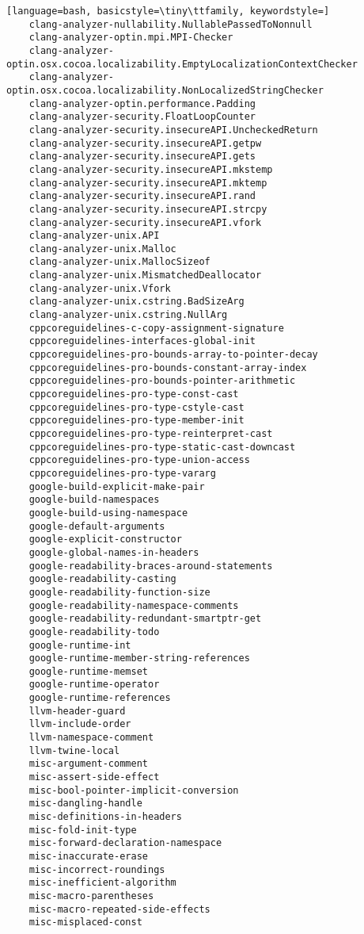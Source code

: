 \documentclass[aspectratio=169]{beamer}
\begin{document}
\begin{lstlisting}[language=bash, basicstyle=\tiny\ttfamily, keywordstyle=]
    clang-analyzer-nullability.NullablePassedToNonnull
    clang-analyzer-optin.mpi.MPI-Checker
    clang-analyzer-optin.osx.cocoa.localizability.EmptyLocalizationContextChecker
    clang-analyzer-optin.osx.cocoa.localizability.NonLocalizedStringChecker
    clang-analyzer-optin.performance.Padding
    clang-analyzer-security.FloatLoopCounter
    clang-analyzer-security.insecureAPI.UncheckedReturn
    clang-analyzer-security.insecureAPI.getpw
    clang-analyzer-security.insecureAPI.gets
    clang-analyzer-security.insecureAPI.mkstemp
    clang-analyzer-security.insecureAPI.mktemp
    clang-analyzer-security.insecureAPI.rand
    clang-analyzer-security.insecureAPI.strcpy
    clang-analyzer-security.insecureAPI.vfork
    clang-analyzer-unix.API
    clang-analyzer-unix.Malloc
    clang-analyzer-unix.MallocSizeof
    clang-analyzer-unix.MismatchedDeallocator
    clang-analyzer-unix.Vfork
    clang-analyzer-unix.cstring.BadSizeArg
    clang-analyzer-unix.cstring.NullArg
    cppcoreguidelines-c-copy-assignment-signature
    cppcoreguidelines-interfaces-global-init
    cppcoreguidelines-pro-bounds-array-to-pointer-decay
    cppcoreguidelines-pro-bounds-constant-array-index
    cppcoreguidelines-pro-bounds-pointer-arithmetic
    cppcoreguidelines-pro-type-const-cast
    cppcoreguidelines-pro-type-cstyle-cast
    cppcoreguidelines-pro-type-member-init
    cppcoreguidelines-pro-type-reinterpret-cast
    cppcoreguidelines-pro-type-static-cast-downcast
    cppcoreguidelines-pro-type-union-access
    cppcoreguidelines-pro-type-vararg
    google-build-explicit-make-pair
    google-build-namespaces
    google-build-using-namespace
    google-default-arguments
    google-explicit-constructor
    google-global-names-in-headers
    google-readability-braces-around-statements
    google-readability-casting
    google-readability-function-size
    google-readability-namespace-comments
    google-readability-redundant-smartptr-get
    google-readability-todo
    google-runtime-int
    google-runtime-member-string-references
    google-runtime-memset
    google-runtime-operator
    google-runtime-references
    llvm-header-guard
    llvm-include-order
    llvm-namespace-comment
    llvm-twine-local
    misc-argument-comment
    misc-assert-side-effect
    misc-bool-pointer-implicit-conversion
    misc-dangling-handle
    misc-definitions-in-headers
    misc-fold-init-type
    misc-forward-declaration-namespace
    misc-inaccurate-erase
    misc-incorrect-roundings
    misc-inefficient-algorithm
    misc-macro-parentheses
    misc-macro-repeated-side-effects
    misc-misplaced-const

\end{lstlisting}
\end{document}
